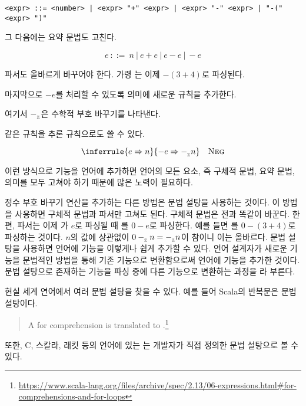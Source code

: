 \begin{verbatim}
<expr> ::= <number> | <expr> "+" <expr> | <expr> "-" <expr> | "-(" <expr> ")"
\end{verbatim}

그 다음에는 요약 문법도 고친다.

\[e\ ::=\ n\ |\ e+e\ |\ e-e\ |\ -e\]

파서도 올바르게 바꾸어야 한다. 가령 는 이제 $-(3+4)$로 파싱된다.

마지막으로 $-e$를 처리할 수 있도록 의미에 새로운 규칙을 추가한다.


여기서 $-_{{}_{\mathbb{Z}}}$은 수학적 부호 바꾸기를 나타낸다.

같은 규칙을 추론 규칙으로도 쓸 수 있다.

\[
  \inferrule
  { e\Rightarrow n}
  { -e\Rightarrow\isub n }
  \quad\textsc{Neg}
\]

이런 방식으로 기능을 언어에 추가하면 언어의 모든 요소, 즉 구체적 문법, 요약
문법, 의미를 모두 고쳐야 하기 때문에 많은 노력이 필요하다.

 정수 부호 바꾸기 연산을 추가하는 다른 방법은 문법 설탕을 사용하는
것이다. 이 방법을 사용하면 구체적 문법과 파서만 고쳐도 된다. 구체적 문법은 전과
똑같이 바꾼다. 한편, 파서는 이제 가 $e$로 파싱될 때 를 $0-e$로 파싱한다. 예를 들면 를 $0-(3+4)$로 파싱하는 것이다.
$n$의 값에 상관없이 $0-_{{}_{\mathbb{Z}}} n=-_{{}_{\mathbb{Z}}} n$이 참이니 이는 올바르다. 문법 설탕을
사용하면 언어에 기능을 이렇게나 쉽게 추가할 수 있다. 언어 설계자가 새로운 기능을
문법적인 방법을 통해 기존 기능으로 변환함으로써 언어에 기능을 추가한 것이다.
문법 설탕으로 존재하는 기능을 파싱 중에 다른 기능으로 변환하는 과정을 라 부른다.

현실 세계 연어에서 여러 문법 설탕을 찾을 수 있다. 예를 들어 Scala의 
반복문은 문법 설탕이다.

\begin{quote}
  A for comprehension  is translated to
  .\footnote{\url{https://www.scala-lang.org/files/archive/spec/2.13/06-expressions.html\#for-comprehensions-and-for-loops}}
\end{quote}

또한, C, 스칼라, 래킷 등의 언어에 있는 는 개발자가 직접
정의한 문법 설탕으로 볼 수 있다.

